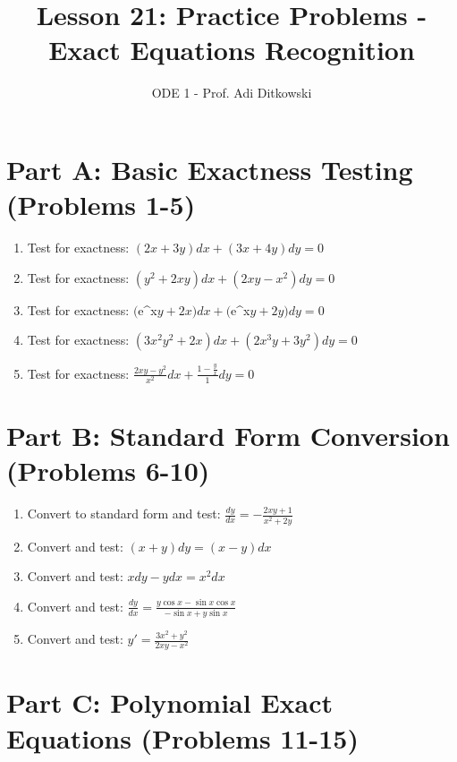 \documentclass[12pt]{article}
\title{Lesson 21: Practice Problems - Exact Equations Recognition}
\author{ODE 1 - Prof. Adi Ditkowski}
\date{}
\begin{document}
\maketitle

\section*{Part A: Basic Exactness Testing (Problems 1-5)}

\begin{enumerate}
\item Test for exactness: $(2x + 3y)dx + (3x + 4y)dy = 0$

\item Test for exactness: $(y^2 + 2xy)dx + (2xy - x^2)dy = 0$

\item Test for exactness: $($e^x\sin$ y + 2x)dx + ($e^x\cos$ y + 2y)dy = 0$

\item Test for exactness: $(3x^2y^2 + 2x)dx + (2x^3y + 3y^2)dy = 0$

\item Test for exactness: $\frac{2xy - y^2}{x^2}dx + \frac{1 - \frac{y}{x}}{1}dy = 0$
\end{enumerate}

\section*{Part B: Standard Form Conversion (Problems 6-10)}

\begin{enumerate}[start=6]
\item Convert to standard form and test: $\frac{dy}{dx} = -\frac{2xy + 1}{x^2 + 2y}$

\item Convert and test: $(x + y)dy = (x - y)dx$

\item Convert and test: $x dy - y dx = x^2 dx$

\item Convert and test: $\frac{dy}{dx} = \frac{y\cos x - \sin x \cos x}{-\sin x + y\sin x}$

\item Convert and test: $y' = \frac{3x^2 + y^2}{2xy - x^2}$
\end{enumerate}

\section*{Part C: Polynomial Exact Equations (Problems 11-15)}
\end{document}
